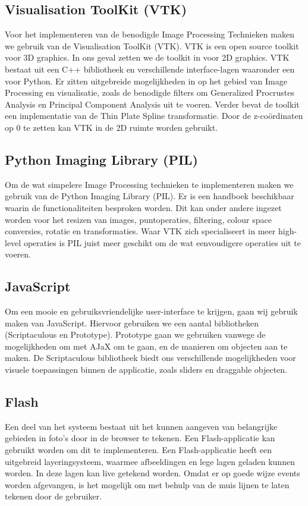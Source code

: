 \subsection{Visualisation ToolKit (VTK)}
Voor het implementeren van de benodigde Image Processing Technieken maken we gebruik van de Visualisation ToolKit (VTK)\cite{vtk}.
VTK is een open source toolkit voor 3D graphics.
In ons geval zetten we de toolkit in voor 2D graphics.
VTK bestaat uit een C++ bibliotheek en verschillende interface-lagen waaronder een voor Python.\cite{vtk2}
Er zitten uitgebreide mogelijkheden in op het gebied van Image Processing en visualisatie, zoals de benodigde filters om Generalized Procrustes Analysis en Principal Component Analysis uit te voeren.
Verder bevat de toolkit een implementatie van de Thin Plate Spline transformatie.
Door de z-co\"{o}rdinaten op 0 te zetten kan VTK in de 2D ruimte worden gebruikt.

\subsection{Python Imaging Library (PIL)}
Om de wat simpelere Image Processing technieken te implementeren maken we gebruik van de Python Imaging Library (PIL)\cite{pil}.
Er is een handboek beschikbaar waarin de functionaliteiten besproken worden.\cite{pilhandbook}
Dit kan onder andere ingezet worden voor het resizen van images, puntoperaties, filtering, colour space conversies, rotatie en transformaties. Waar VTK zich specialiseert in meer high-level operaties is PIL juist meer geschikt om de wat eenvoudigere operaties uit te voeren.

\subsection{JavaScript}
Om een mooie en gebruiksvriendelijke user-interface te krijgen, gaan wij gebruik maken van JavaScript.
Hiervoor gebruiken we een aantal bibliotheken (Scriptaculous\cite{scriptaculous} en Prototype\cite{prototype}).
Prototype gaan we gebruiken vanwege de mogelijkheden om met AJaX om te gaan, en de manieren om objecten aan te maken.
De Scriptaculous bibliotheek biedt ons verschillende mogelijkheden voor visuele toepassingen binnen de applicatie, zoals sliders en draggable objecten.

\subsection{Flash}
Een deel van het systeem bestaat uit het kunnen aangeven van belangrijke gebieden in foto's door in de browser te tekenen. Een Flash-applicatie kan gebruikt worden om dit te implementeren. Een Flash-applicatie heeft een uitgebreid layeringsysteem, waarmee afbeeldingen en lege lagen geladen kunnen worden. In deze lagen kan live getekend worden. Omdat er op goede wijze events worden afgevangen, is het mogelijk om met behulp van de muis lijnen te laten tekenen door de gebruiker.

